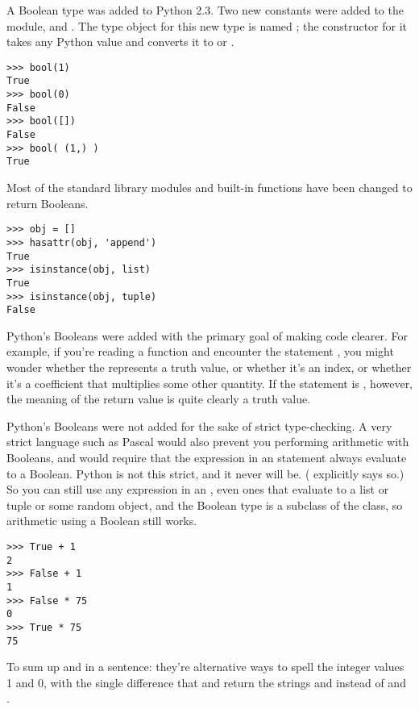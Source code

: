 \documentclass{howto}
\begin{document}
A Boolean type was added to Python 2.3.  Two new constants were added
to the  module,  and
.  The type object for this new type is named
; the constructor for it takes any Python value and
converts it to  or .

\begin{verbatim}
>>> bool(1)
True
>>> bool(0)
False
>>> bool([])
False
>>> bool( (1,) )
True
\end{verbatim}

Most of the standard library modules and built-in functions have been
changed to return Booleans.

\begin{verbatim}
>>> obj = []
>>> hasattr(obj, 'append')
True
>>> isinstance(obj, list)
True
>>> isinstance(obj, tuple)
False
\end{verbatim}

Python's Booleans were added with the primary goal of making code
clearer.  For example, if you're reading a function and encounter the
statement , you might wonder whether the 
represents a truth value, or whether it's an index, or whether it's a
coefficient that multiplies some other quantity.  If the statement is
, however, the meaning of the return value is quite
clearly a truth value.

Python's Booleans were not added for the sake of strict type-checking.
A very strict language such as Pascal would also prevent you
performing arithmetic with Booleans, and would require that the
expression in an  statement always evaluate to a Boolean.
Python is not this strict, and it never will be.  (
explicitly says so.)  So you can still use any expression in an
, even ones that evaluate to a list or tuple or some
random object, and the Boolean type is a subclass of the
 class, so arithmetic using a Boolean still works.

\begin{verbatim}
>>> True + 1
2
>>> False + 1
1
>>> False * 75
0
>>> True * 75
75
\end{verbatim}

To sum up  and  in a sentence: they're
alternative ways to spell the integer values 1 and 0, with the single
difference that  and  return the
strings  and  instead of  and .
\end{document}
